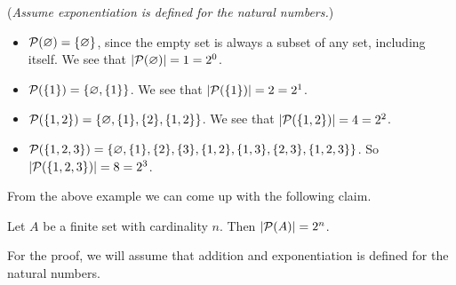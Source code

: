 \begin{example}
    (\textit{Assume exponentiation is defined for the natural numbers.})
    \begin{itemize}[leftmargin=*]
        \item ${\mathcal{P}(\varnothing)} = \{\varnothing\}$, since the empty set is always a subset of any set, including itself. We see that $|{\mathcal{P}(\varnothing)}| = 1 = 2^0$.
        \item ${\mathcal{P}(\{1\})} = \{\varnothing, \{1\}\}$. We see that $|{\mathcal{P}(\{1\})}| = 2 = 2^1$.
        \item ${\mathcal{P}(\{1, 2\})} = \{\varnothing, \{1\}, \{2\}, \{1, 2\}\}$. We see that $|{\mathcal{P}(\{1, 2\})}| = 4 = 2^2$.
        \item ${\mathcal{P}(\{1, 2, 3\})} = \{\varnothing, \{1\}, \{2\}, \{3\}, \{1, 2\}, \{1, 3\}, \{2, 3\}, \{1, 2, 3\}\}$. So $|{\mathcal{P}(\{1, 2, 3\})}| = 8 = 2^3$.
    \end{itemize}
\end{example}

From the above example we can come up with the following claim.

\begin{proposition}
    Let $A$ be a finite set with cardinality $n$. Then $|{\mathcal{P}(A)}| = 2^n$.
\end{proposition}

For the proof, we will assume that addition and exponentiation is defined for the natural numbers.

